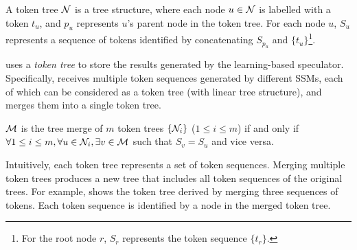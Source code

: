 \begin{definition}
A token tree $\mathcal{N}$ is a tree structure, where each node $u \in \mathcal{N}$ is labelled with a token $t_u$, and $p_u$ represents $u$'s parent node in the token tree. 
For each node $u$, $S_u$ represents a sequence of tokens identified by concatenating $S_{p_u}$ and $\{t_u\}$\footnote{For the root node $r$, $S_r$ represents the token sequence $\{t_r\}$.}.
\end{definition}

\Sys uses a {\em token tree} to store the results generated by the learning-based speculator. Specifically, \Sys receives multiple token sequences generated by different SSMs, each of which can be considered as a token tree (with linear tree structure), and merges them into a single token tree.

\begin{definition}
$\mathcal{M}$ is the tree merge of $m$ token trees $\{\mathcal{N}_i\}$ ($1\leq i \leq m$) if and only if $\forall 1\leq i \leq m, \forall u \in \mathcal{N}_i, \exists v \in \mathcal{M}$ such that $S_v = S_u$ and vice versa.
\end{definition}

Intuitively, each token tree represents a set of token sequences. Merging multiple token trees produces a new tree that includes all token sequences of the original trees.
For example,  shows the token tree derived by merging three sequences of tokens.
Each token sequence is identified by a node in the merged token tree.
\fi 

